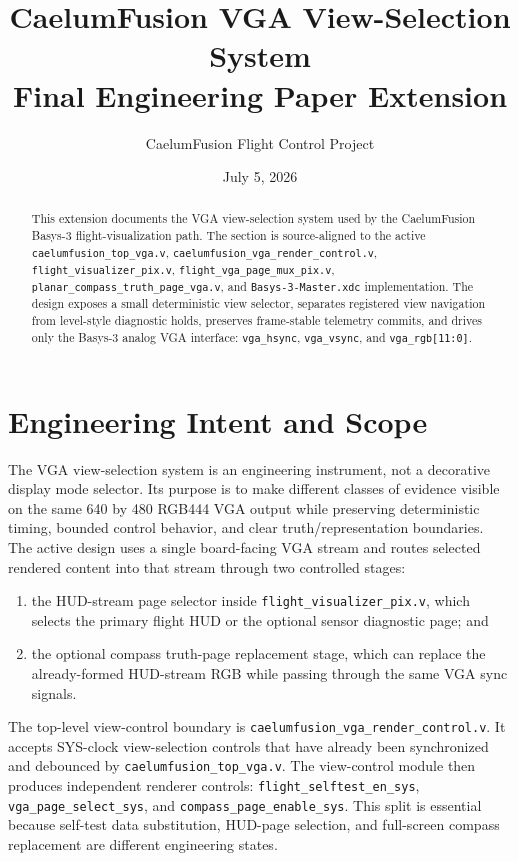 \documentclass{article}
\title{\textbf{CaelumFusion VGA View-Selection System}\\Final Engineering Paper Extension}
\author{CaelumFusion Flight Control Project}
\date{July 5, 2026}
\newcommand{\sig}[1]{\begingroup\nolinkurl{#1}\endgroup}
\newcommand{\file}[1]{\begingroup\nolinkurl{#1}\endgroup}
\begin{document}
\maketitle

\begin{abstract}
This extension documents the VGA view-selection system used by the
CaelumFusion Basys-3 flight-visualization path.  The section is source-aligned
to the active \file{caelumfusion_top_vga.v},
\file{caelumfusion_vga_render_control.v}, \file{flight_visualizer_pix.v},
\file{flight_vga_page_mux_pix.v}, \file{planar_compass_truth_page_vga.v}, and
\file{Basys-3-Master.xdc} implementation.  The design exposes a small
deterministic view selector, separates registered view navigation from
level-style diagnostic holds, preserves frame-stable telemetry commits, and
drives only the Basys-3 analog VGA interface:
\sig{vga_hsync}, \sig{vga_vsync}, and \sig{vga_rgb[11:0]}.
\end{abstract}

\section{Engineering Intent and Scope}

The VGA view-selection system is an engineering instrument, not a decorative
display mode selector.  Its purpose is to make different classes of evidence
visible on the same 640 by 480 RGB444 VGA output while preserving deterministic
timing, bounded control behavior, and clear truth/representation boundaries.
The active design uses a single board-facing VGA stream and routes selected
rendered content into that stream through two controlled stages:

\begin{enumerate}
  \item the HUD-stream page selector inside \file{flight_visualizer_pix.v},
        which selects the primary flight HUD or the optional sensor diagnostic
        page; and
  \item the optional compass truth-page replacement stage, which can replace
        the already-formed HUD-stream RGB while passing through the same VGA
        sync signals.
\end{enumerate}

The top-level view-control boundary is \file{caelumfusion_vga_render_control.v}.
It accepts SYS-clock view-selection controls that have already been synchronized
and debounced by \file{caelumfusion_top_vga.v}.  The view-control module then
produces independent renderer controls:
\sig{flight_selftest_en_sys}, \sig{vga_page_select_sys}, and
\sig{compass_page_enable_sys}.  This split is essential because self-test data
substitution, HUD-page selection, and full-screen compass replacement are
different engineering states.
\end{document}

